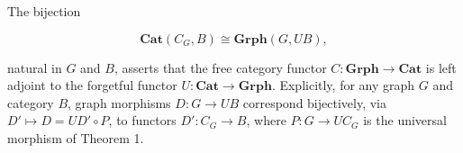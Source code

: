 The bijection

$$\mathbf{Cat}(C_G, B) \cong \mathbf{Grph}(G, UB),$$

natural in $G$ and $B$, asserts that the free category functor $C: \mathbf{Grph} \to \mathbf{Cat}$ is left adjoint to the forgetful functor $U: \mathbf{Cat} \to \mathbf{Grph}$. Explicitly, for any graph $G$ and category $B$, graph morphisms $D: G \to UB$ correspond bijectively, via $D' \mapsto D = UD' \circ P$, to functors $D': C_G \to B$, where $P: G \to UC_G$ is the universal morphism of Theorem 1.
